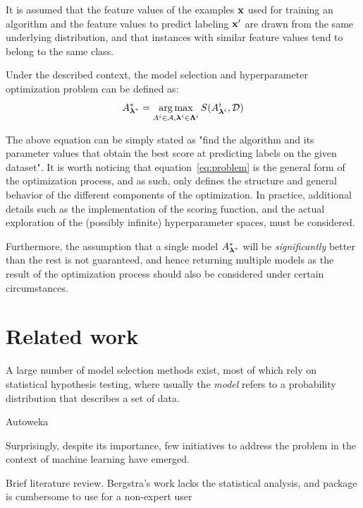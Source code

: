 	It is assumed that the feature values of the examples $\mathbf{x}$ used for training an algorithm
	and the feature values to predict labeling $\mathbf{x}'$ are drawn from the same underlying
	distribution, and that instances with similar feature values tend to belong to the same class.

	Under the described context, the model selection and hyperparameter optimization problem can be
	defined as:
	\begin{equation}
		\label{eq:problem}
		A^*_{\boldsymbol{\lambda}^*} = \operatorname*{arg\,max}_{A^i \in \mathcal{A}, \boldsymbol{\lambda}^i \in \mathbf{\Lambda}^i}
		S(A^i_{\boldsymbol{\lambda}^i}, \mathcal{D})
	\end{equation}

	The above equation can be simply stated as "find the algorithm and its parameter values that
	obtain the best score at predicting labels on the given dataset". It is worth noticing that
	equation~\ref{eq:problem} is the general form of the optimization process, and as such, only
	defines the structure and general behavior of the different components of the optimization. In
	practice, additional details such as the implementation of the scoring function, and the actual
	exploration of the (possibly infinite) hyperparameter spaces, must be considered.

	Furthermore, the assumption that a single model $A^*_{\boldsymbol{\lambda}^*}$ will be \emph{significantly} better than the
	rest is not guaranteed, and hence returning multiple models as the result of the
	optimization process should also be considered under certain circumstances.

	\section{Related work}

	A large number of model selection methods exist, most of which rely on statistical hypothesis
	testing, where usually the \emph{model} refers to a probability distribution that describes a
	set of data.

	Autoweka
	
	Surprisingly, despite its importance, few initiatives to address the problem in the context of
	machine learning have emerged.

	Brief literature review. Bergstra's work \cite{bergstra2011hyperparameter} lacks the statistical
	analysis, and package is cumbersome to use for a non-expert user
